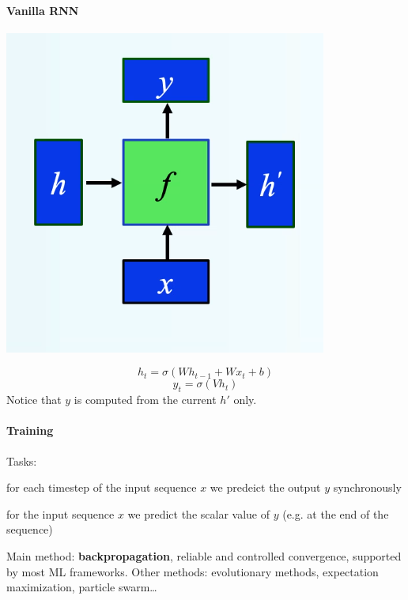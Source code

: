 \documentclass[10pt]{report}
\begin{document}
\paragraph{Vanilla RNN}
\begin{center}
	\includegraphics[scale=0.5]{26.png}
\end{center}
$$h_t = \sigma\left(Wh_{t-1} + Wx_t + b\right)$$
$$y_t = \sigma\left(Vh_t\right)$$
Notice that $y$ is computed from the current $h'$ only.
\paragraph{Training} Tasks:
\begin{list}{}{}
	\item for each timestep of the input sequence $x$ we predeict the output $y$ synchronously
	\item for the input sequence $x$ we predict the scalar value of $y$ (e.g. at the end of the sequence)
\end{list}
Main method: \textbf{backpropagation}, reliable and controlled convergence, supported by most ML frameworks. Other methods: evolutionary methods, expectation maximization, particle swarm\ldots\\
\end{document}
